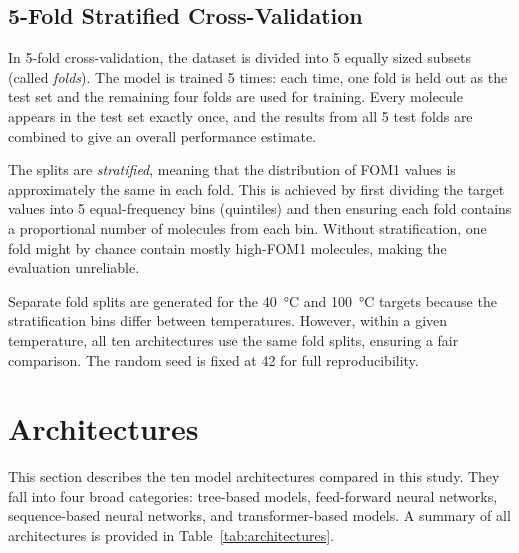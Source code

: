 \documentclass[11pt,a4paper]{article}
\begin{document}
\subsection{5-Fold Stratified Cross-Validation}

In 5-fold cross-validation, the dataset is divided into 5 equally sized subsets (called \emph{folds}). The model is trained 5 times: each time, one fold is held out as the test set and the remaining four folds are used for training. Every molecule appears in the test set exactly once, and the results from all 5 test folds are combined to give an overall performance estimate.

The splits are \emph{stratified}, meaning that the distribution of FOM1 values is approximately the same in each fold. This is achieved by first dividing the target values into 5 equal-frequency bins (quintiles) and then ensuring each fold contains a proportional number of molecules from each bin. Without stratification, one fold might by chance contain mostly high-FOM1 molecules, making the evaluation unreliable.

Separate fold splits are generated for the \SI{40}{\degreeCelsius} and \SI{100}{\degreeCelsius} targets because the stratification bins differ between temperatures. However, within a given temperature, all ten architectures use the same fold splits, ensuring a fair comparison. The random seed is fixed at 42 for full reproducibility.

\section{Architectures}

This section describes the ten model architectures compared in this study. They fall into four broad categories: tree-based models, feed-forward neural networks, sequence-based neural networks, and transformer-based models. A summary of all architectures is provided in Table~\ref{tab:architectures}.
\end{document}
